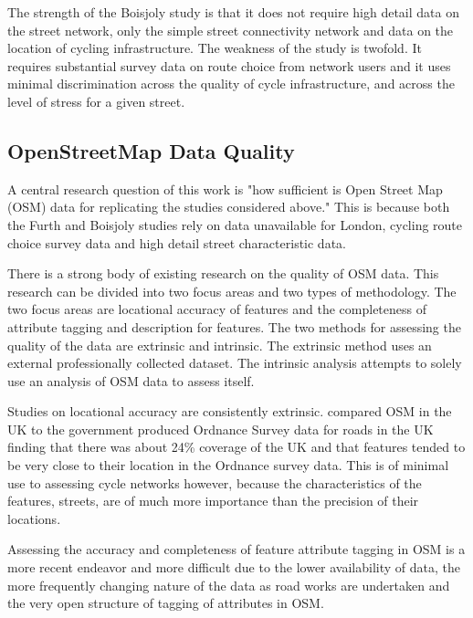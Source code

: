 The strength of the Boisjoly study is that it does not require high detail data on the street network, only the simple street connectivity network and data on the location of cycling infrastructure. The weakness of the study is twofold. It requires substantial survey data on route choice from network users and it uses minimal discrimination across the quality of cycle infrastructure, and across the level of stress for a given street. 

\subsection{OpenStreetMap Data Quality}\label{OSMQuality}

A central research question of this work is "how sufficient is Open Street Map (OSM) data for replicating the studies considered above." This is because both the Furth and Boisjoly studies rely on data unavailable for London, cycling route choice survey data and high detail street characteristic data. 

There is a strong body of existing research on the quality of OSM data. This research can be divided into two focus areas and two types of methodology. The two focus areas are locational accuracy of features and the completeness of attribute tagging and description for features. The two methods for assessing the quality of the data are extrinsic and intrinsic. The extrinsic method uses an external professionally collected dataset. The intrinsic analysis attempts to solely use an analysis of OSM data to assess itself. 

Studies on locational accuracy are consistently extrinsic. \textcite{haklay2010good} compared OSM in the UK to the government produced Ordnance Survey data for roads in the UK finding that there was about 24\% coverage of the UK and that features tended to be very close to their location in the Ordnance survey data. This is of minimal use to assessing cycle networks however, because the characteristics of the features, streets, are of much more importance than the precision of their locations. 

Assessing the accuracy and completeness of feature attribute tagging in OSM is a more recent endeavor and more difficult due to the lower availability of data, the more frequently changing nature of the data as road works are undertaken and the very open structure of tagging of attributes in OSM.  

